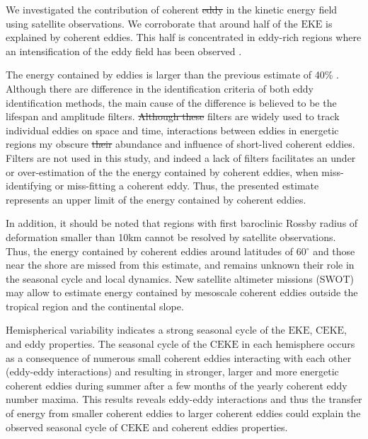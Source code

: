 \documentclass[draft,linenumbers]{agujournal2019}
\newcommand{\EKE}{\textrm{EKE}}
\newcommand{\CEKE}{\textrm{CEKE}}
\providecommand{\DIFadd}[1]{{\protect\color{blue}\uwave{#1}}} %
\providecommand{\DIFdel}[1]{{\protect\color{red}\sout{#1}}}                      %
\providecommand{\DIFaddbegin}{} %
\providecommand{\DIFaddend}{} %
\providecommand{\DIFdelbegin}{} %
\providecommand{\DIFdelend}{} %
\begin{document}
	We investigated the contribution of coherent \DIFdelbegin \DIFdel{eddy }\DIFdelend \DIFaddbegin \DIFadd{eddies }\DIFaddend in the kinetic energy field using satellite observations. 
	We corroborate that around half of the $\EKE$ is explained by coherent eddies. 
	This half is concentrated in eddy-rich regions where an intensification of the eddy field has been observed \citep{Martinez_Kinetic_2021}. \DIFdelbegin %

\DIFdelend The energy contained by eddies is larger than the previous estimate of 40\% \DIFaddbegin \DIFadd{by \mbox{%
\citet{Chelton_The_2011}}\hspace{0pt}%
}\DIFaddend .
	Although there are difference in the identification criteria of both eddy identification methods, the main cause of the difference is believed to be the lifespan and amplitude filters. 
	\DIFdelbegin \DIFdel{Although these }\DIFdelend \DIFaddbegin \DIFadd{These }\DIFaddend filters are widely used to track individual eddies on space and time, \DIFaddbegin \DIFadd{however, }\DIFaddend interactions between eddies in energetic regions my obscure \DIFdelbegin \DIFdel{their }\DIFdelend \DIFaddbegin \DIFadd{the }\DIFaddend abundance and influence of short-lived coherent eddies. 
	Filters are not used in this study, and indeed a lack of filters \DIFaddbegin \DIFadd{could }\DIFaddend facilitates an under or over-estimation of the the energy contained by coherent eddies, when miss-identifying or miss-fitting a coherent eddy. 
	Thus, the presented estimate represents an upper limit of the energy contained by coherent eddies. 

	In addition, it should be noted that regions with first baroclinic Rossby radius of deformation smaller than 10km cannot be resolved by satellite observations. 
	Thus, the energy contained by coherent eddies around latitudes of 60$^\circ$ and those near the shore are missed from this estimate, and remains unknown their role in the seasonal cycle and local dynamics. New satellite altimeter missions (SWOT) may allow to estimate energy contained by mesoscale coherent eddies outside the tropical region and the continental slope.

	Hemispherical variability indicates a strong seasonal cycle of the $\EKE$, $\CEKE$, and eddy properties. 
	The seasonal cycle of the $\CEKE$ in each hemisphere occurs as a consequence of numerous small coherent eddies interacting with each other (eddy-eddy interactions) and resulting in stronger, larger and more energetic coherent eddies during summer after a few months of the yearly coherent eddy number maxima.
	This results reveals eddy-eddy interactions and thus the transfer of energy from smaller coherent eddies to larger coherent eddies could explain the observed seasonal cycle of $\CEKE$ and coherent eddies properties.
\end{document}
